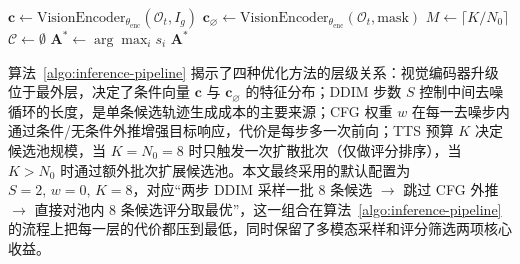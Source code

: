 \begin{algorithm}[htb]
    \caption{统一推理模块在单次高层周期内的执行流程}
    \label{algo:inference-pipeline}
    \SetAlgoLined
    \BlankLine
    $\mathbf{c} \leftarrow \text{VisionEncoder}_{\theta_{\text{enc}}}(\mathcal{O}_t, I_g)$\;
    $\mathbf{c}_\varnothing \leftarrow \text{VisionEncoder}_{\theta_{\text{enc}}}(\mathcal{O}_t, \text{mask})$\;
    \BlankLine
    $M \leftarrow \lceil K / N_0 \rceil$
    $\mathcal{C} \leftarrow \emptyset$\;
    \BlankLine
    $\mathbf{A}^\ast \leftarrow \arg\max_{i} s_i$\;
    \Return $\mathbf{A}^\ast$\;
\end{algorithm}

算法~\ref{algo:inference-pipeline} 揭示了四种优化方法的层级关系：视觉编码器升级位于最外层，决定了条件向量 $\mathbf{c}$ 与 $\mathbf{c}_\varnothing$ 的特征分布；DDIM 步数 $S$ 控制中间去噪循环的长度，是单条候选轨迹生成成本的主要来源；CFG 权重 $w$ 在每一去噪步内通过条件/无条件外推增强目标响应，代价是每步多一次前向；TTS 预算 $K$ 决定候选池规模，当 $K=N_0=8$ 时只触发一次扩散批次（仅做评分排序），当 $K>N_0$ 时通过额外批次扩展候选池。本文最终采用的默认配置为 $S=2,\,w=0,\,K=8$，对应``两步 DDIM 采样一批 8 条候选 $\to$ 跳过 CFG 外推 $\to$ 直接对池内 8 条候选评分取最优''，这一组合在算法~\ref{algo:inference-pipeline} 的流程上把每一层的代价都压到最低，同时保留了多模态采样和评分筛选两项核心收益。

